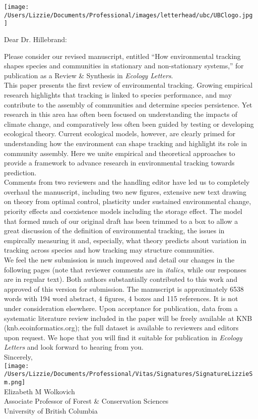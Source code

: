 \documentclass[11pt,a4paper]{letter}
\begin{document}
\begin{letter}{}
\texttt{[image: /Users/Lizzie/Documents/Professional/images/letterhead/ubc/UBClogo.jpg]}
\opening{Dear Dr. Hillebrand:}
Please consider our revised manuscript, entitled ``How environmental tracking shapes species and communities in stationary and non-stationary systems,'' for publication as a Review \& Synthesis in \emph{Ecology Letters}. 
\vspace{1.5ex}\\
This paper presents the first review of environmental tracking. Growing empirical research highlights that tracking is linked to species performance, and may contribute to the assembly of communities and determine species persistence. Yet research in this area has often been focused on understanding the impacts of climate change, and comparatively less often been guided by testing or developing ecological theory. Current ecological models, however, are clearly primed for understanding how the environment can shape tracking and highlight its role in community assembly. Here we unite empirical and theoretical approaches to provide a framework to advance research in environmental tracking towards prediction. 
\vspace{1.5ex}\\
Comments from two reviewers and the handling editor have led us to completely overhaul the manuscript, including two new figures, extensive new text drawing on theory from optimal control, plasticity under sustained environmental change, priority effects and coexistence models including the storage effect. The model that formed much of our original draft has been trimmed to a box to allow a great discussion of the definition of environmental tracking, the issues in empircally measuring it and, especially, what theory predicts about variation in tracking across species and how tracking may structure communities. 
\vspace{1.5ex}\\
We feel the new submission is much improved and detail our changes in the following pages (note that reviewer comments are in \emph{italics}, while our responses are in regular text). Both authors substantially contributed to this work and approved of this version for submission. The manuscript is approximately 6538 words with 194 word abstract, 4 figures,  4 boxes and 115 references. It is not under consideration elsewhere. Upon acceptance for publication, data from a systematic literature review included in the paper will be freely available at KNB (knb.ecoinformatics.org); the full dataset is available to reviewers and editors upon request. We hope that you will find it suitable for publication in \emph{Ecology Letters} and look forward to hearing from you.
\vspace{1.5ex}\\
Sincerely,\\

\texttt{[image: /Users/Lizzie/Documents/Professional/Vitas/Signatures/SignatureLizzieSm.png]} \\

Elizabeth M Wolkovich\\
Associate Professor of Forest \& Conservation Sciences\\ 
University of British Columbia
\end{letter}
\end{document}

